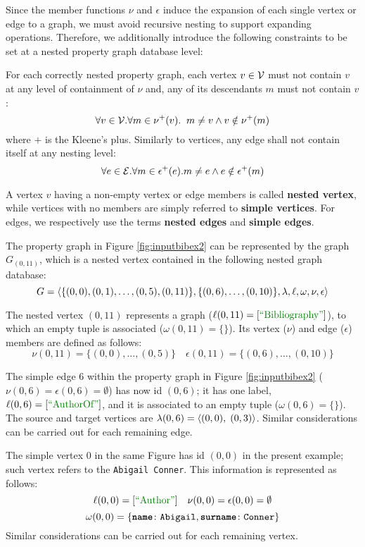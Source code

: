 Since the member functions $\nu$ and $\epsilon$ induce the expansion of each single vertex or edge to a graph, we must avoid recursive nesting to support expanding operations.
Therefore, we additionally introduce the following constraints to be set at a nested property graph database level:

\begin{axiom}
	For each correctly nested property graph, each vertex $v\in \mathcal{V}$ must not contain $v$ at any level of containment of $\nu$ and, any of its descendants $m$ must not contain $v$:
	\[\forall v\in \mathcal{V}. \forall m\in \nu^+(v).\;\; m\neq v\wedge v\notin \nu^+(m)\]
	where $+$ is the Kleene's plus. Similarly to vertices, any edge shall not contain itself at any nesting level:
	\[\forall e\in \mathcal{E}. \forall m\in \epsilon^+(e). m\neq e\wedge e\notin \epsilon^+(m)\]
\end{axiom}

A vertex $v$ having a non-empty vertex or edge members is called \textbf{nested vertex}, while vertices with no members are simply referred to \textbf{simple vertices}. For edges, we respectively use the terms \textbf{nested edges} and \textbf{simple edges}. 

\begin{ex}[label=exImpl]
The property graph in Figure \ref{fig:inputbibex2} can be represented by the graph $G_{(0,11)}$, which is a nested vertex contained in the following nested graph database:
\[G=\Braket{\{(0,0),(0,1),\dots,(0,5),(0,11)\}, \{(0,6),\dots,(0,10)\},\lambda,\ell,\omega,\nu,\epsilon}\]

The nested vertex $(0,11)$  represents a  graph ($\ell(0,11)=[\mstr{Bibliography}]$), to which an empty tuple is associated ($\omega(0,11)=\{\}$). Its vertex ($\nu$) and edge ($\epsilon$) members are defined as follows:
\[\nu(0,11)=\{(0,0),\dots,(0,5)\}\quad\epsilon(0,11)=\{(0,6),\dots,(0,10)\}\]

The simple edge $6$ within the property graph in Figure \ref{fig:inputbibex2} ($\nu(0,6)=\epsilon(0,6)=\emptyset$) has now id $(0,6)$; it has one label, $\ell(0,6)=[\mstr{AuthorOf}]$, and it is associated to an empty tuple ($\omega(0,6)=\{\}$).
The source and target vertices are 
$\lambda(0,6)=\Braket{(0,0),\;(0,3)}$. Similar considerations can be carried out for each  remaining edge.

The simple vertex $0$ in the same Figure has id $(0,0)$ in the present example; such vertex refers to the  \texttt{Abigail Conner}. This information is represented as follows:
\[\ell(0,0)=[\mstr{Author}]\quad\nu(0,0)=\epsilon(0,0)=\emptyset\] \[\omega(0,0)=\{\texttt{\textbf{name}}\colon\texttt{Abigail},\texttt{\textbf{surname}}\colon\texttt{Conner}\}\]
Similar considerations can be carried out for each remaining vertex.

\end{ex}

